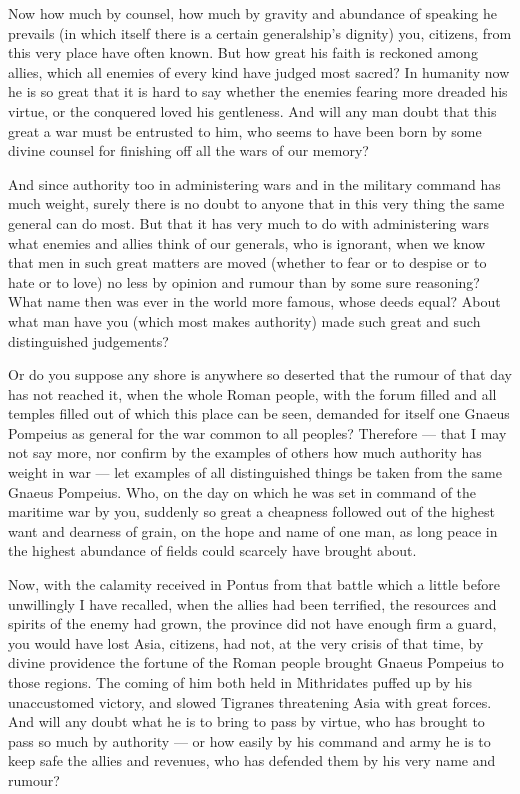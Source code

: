  Now how much by counsel, how much by gravity and abundance of speaking he prevails (in which itself there is a certain generalship's dignity) you, citizens, from this very place have often known. But how great his faith is reckoned among allies, which all enemies of every kind have judged most sacred? In humanity now he is so great that it is hard to say whether the enemies fearing more dreaded his virtue, or the conquered loved his gentleness. And will any man doubt that this great a war must be entrusted to him, who seems to have been born by some divine counsel for finishing off all the wars of our memory?

 And since authority too in administering wars and in the military command has much weight, surely there is no doubt to anyone that in this very thing the same general can do most. But that it has very much to do with administering wars what enemies and allies think of our generals, who is ignorant, when we know that men in such great matters are moved (whether to fear or to despise or to hate or to love) no less by opinion and rumour than by some sure reasoning? What name then was ever in the world more famous, whose deeds equal? About what man have you (which most makes authority) made such great and such distinguished judgements?

 Or do you suppose any shore is anywhere so deserted that the rumour of that day has not reached it, when the whole Roman people, with the forum filled and all temples filled out of which this place can be seen, demanded for itself one Gnaeus Pompeius as general for the war common to all peoples? Therefore --- that I may not say more, nor confirm by the examples of others how much authority has weight in war --- let examples of all distinguished things be taken from the same Gnaeus Pompeius. Who, on the day on which he was set in command of the maritime war by you, suddenly so great a cheapness followed out of the highest want and dearness of grain, on the hope and name of one man, as long peace in the highest abundance of fields could scarcely have brought about.

 Now, with the calamity received in Pontus from that battle which a little before unwillingly I have recalled, when the allies had been terrified, the resources and spirits of the enemy had grown, the province did not have enough firm a guard, you would have lost Asia, citizens, had not, at the very crisis of that time, by divine providence the fortune of the Roman people brought Gnaeus Pompeius to those regions. The coming of him both held in Mithridates puffed up by his unaccustomed victory, and slowed Tigranes threatening Asia with great forces. And will any doubt what he is to bring to pass by virtue, who has brought to pass so much by authority --- or how easily by his command and army he is to keep safe the allies and revenues, who has defended them by his very name and rumour?

